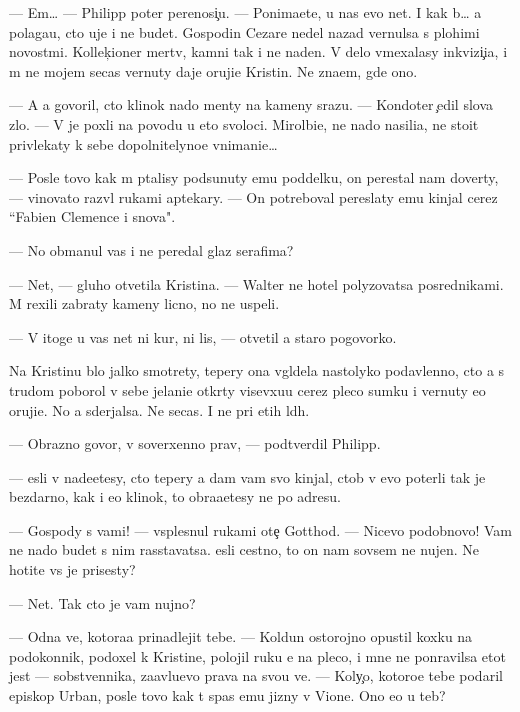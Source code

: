 \documentclass[10pt]{book}
\begin{document}
— Em… — Philipp poter perenosi{\c}u. — Ponima{\y}ete, u nas {\y}evo net. I kak b{\yi}… {\y}a polaga{\y}u, cto uje i ne budet. Gospodin Cezare nedel{\iu} nazad vernulsa s plohimi novost{\ia}mi. Kollek{\c}ioner mertv, kamni tak i ne na{\y}den{\yi}. V delo vmexalasy inkvizi{\c}i{\y}a, i m{\yi} ne mojem se{\y}cas vernuty daje oruji{\y}e Kristin{\yi}. Ne zna{\y}em, gde ono.

— A {\y}a govoril, cto klinok nado men{\ia}ty na kameny srazu. — Kondot{\y}er {\c}edil slova zlo. — V{\yi} je poxli na povodu u eto{\y} svoloci. Mirol{\iu}bi{\y}e, ne nado nasili{\y}a, ne sto{\y}it privlekaty k sebe dopolnitelyno{\y}e vnimani{\y}e…

— Posle tovo kak m{\yi} p{\yi}talisy podsunuty {\y}emu poddelku, on perestal nam dover{\ia}ty, — vinovato razv{\e}l rukami aptekary. — On potreboval pereslaty {\y}emu kinjal cerez ``Fabien Clemence i s{\yi}nov{\y}a".

— No obmanul vas i ne peredal glaz serafima?

— Net, — gluho otvetila Kristina. — Walter ne hotel polyzovatsa posrednikami. M{\yi} rexili zabraty kameny licno, no ne uspeli.

— V itoge u vas net ni kur, ni lis{\yi}, — otvetil {\y}a staro{\y} pogovorko{\y}.

Na Kristinu b{\yi}lo jalko smotrety, tepery ona v{\yi}gl{\ia}dela nastolyko podavlenno{\y}, cto {\y}a s trudom poborol v sebe jelani{\y}e otkr{\yi}ty visevxu{\y}u cerez pleco sumku i vernuty {\y}e{\y}o oruji{\y}e. No {\y}a sderjalsa. Ne se{\y}cas. I ne pri etih l{\iu}d{\ia}h.

— Obrazno govor{\ia}, v{\yi} soverxenno prav{\yi}, — podtverdil Philipp.

— {\Y}esli v{\yi} nade{\y}etesy, cto tepery {\y}a dam vam svo{\y} kinjal, ctob{\yi} v{\yi} {\y}evo poter{\ia}li tak je bezdarno, kak i {\y}e{\y}o klinok, to obra{\x}a{\y}etesy ne po adresu.

— Gospody s vami! — vsplesnul rukami ote{\c} Gotthod. — Nicevo podobnovo! Vam ne nado budet s nim rasstavatsa. {\Y}esli cestno, to on nam sovsem ne nujen. Ne hotite vs{\e} je prisesty?

— Net. Tak cto je vam nujno?

— Odna ve{\x}, kotora{\y}a prinadlejit tebe. — Koldun ostorojno opustil koxku na podokonnik, podoxel k Kristine, polojil ruku {\y}e{\y} na pleco, i mne ne ponravilsa etot jest — sobstvennika, za{\y}avl{\ia}{\y}u{\x}evo prava na svo{\y}u ve{\x}. — Koly{\c}o, kotoro{\y}e tebe podaril {\y}episkop Urban, posle tovo kak t{\yi} spas {\y}emu jizny v Vione. Ono {\y}e{\x}o u teb{\ia}?
\end{document}
